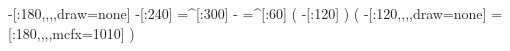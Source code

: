     -[:180,,,,draw=none]%
                 -[:240]%
                =^[:300]%
                       -%
                 =^[:60]%
                           (
                     -[:120]%
                           )
                           (
        -[:120,,,,draw=none]%
    =[:180,,,,mcfx={10}{10}]%
                           )
